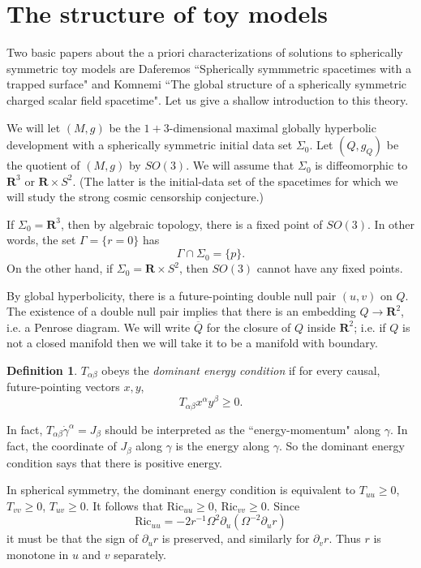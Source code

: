 \documentclass[12pt]{report}
\newcommand{\RR}{\mathbf{R}}
\newcommand{\Ric}{\text{Ric}}
\newcommand{\dfn}[1]{\emph{#1}\index{#1}}
\theoremstyle{definition}
\newtheorem{definition}[theorem]{Definition}
\theoremstyle{remark}
\begin{document}
\section{The structure of toy models}
    Two basic papers about the a priori characterizations of solutions to spherically symmetric toy models are Daferemos ``Spherically symmmetric spacetimes with a trapped surface" and Komnemi ``The global structure of a spherically symmetric charged scalar field spacetime". Let us give a shallow introduction to this theory.

    We will let $(M, g)$ be the $1+3$-dimensional maximal globally hyperbolic development with a spherically symmetric initial data set $\Sigma_0$. Let $(Q, g_Q)$ be the quotient of $(M, g)$ by $SO(3)$. We will assume that $\Sigma_0$ is diffeomorphic to $\RR^3$ or $\RR \times S^2$. (The latter is the initial-data set of the spacetimes for which we will study the strong cosmic censorship conjecture.)

    If $\Sigma_0 = \RR^3$, then by algebraic topology, there is a fixed point of $SO(3)$. In other words, the set $\Gamma = \{r = 0\}$ has
    $$\Gamma \cap \Sigma_0 = \{p\}.$$
    On the other hand, if $\Sigma_0 = \RR \times S^2$, then $SO(3)$ cannot have any fixed points.

    By global hyperbolicity, there is a future-pointing double null pair $(u, v)$ on $Q$. The existence of a double null pair implies that there is an embedding $Q \to \RR^2$, i.e. a Penrose diagram. We will write $\overline Q$ for the closure of $Q$ inside $\RR^2$; i.e. if $Q$ is not a closed manifold then we will take it to be a manifold with boundary.

\begin{definition}
    $T_{\alpha\beta}$ obeys the \dfn{dominant energy condition} if for every causal, future-pointing vectors $x, y$,
    $$T_{\alpha\beta}x^\alpha y^\beta \geq 0.$$
\end{definition}
    In fact, $T_{\alpha\beta} \dot \gamma^\alpha = J_\beta$ should be interpreted as the ``energy-momentum" along $\gamma$. In fact, the coordinate of $J_\beta$ along $\gamma$ is the energy along $\gamma$. So the dominant energy condition says that there is positive energy.

    In spherical symmetry, the dominant energy condition is equivalent to $T_{uu} \geq 0$, $T_{vv} \geq 0$, $T_{uv} \geq 0$. It follows that $\Ric_{uu} \geq 0$, $\Ric_{vv} \geq 0$. Since
    $$\Ric_{uu} = -2r^{-1}\Omega^2 \partial_u (\Omega^{-2}\partial_ur)$$
    it must be that the sign of $\partial_ur$ is preserved, and similarly for $\partial_vr$. Thus $r$ is monotone in $u$ and $v$ separately.
\end{document}
